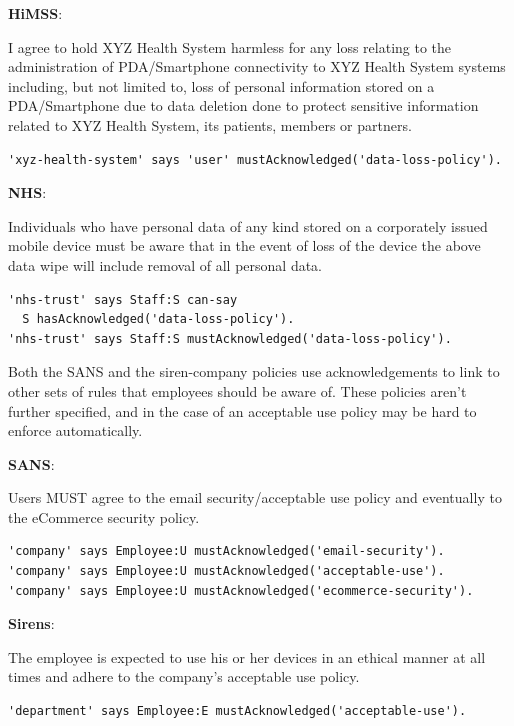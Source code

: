 \documentclass{llncs}
\newenvironment{policyrule}[1]{%
  \begin{mdframed}\footnotesize
      \noindent\textbf{\sffamily #1}:~\itshape%
}{%
  \end{mdframed}
}
\begin{document}
\begin{center}
  \noindent
    \begin{policyrule}{HiMSS}
      I agree to hold XYZ Health System harmless for any loss relating to the
      administration of PDA/Smartphone connectivity to XYZ Health System systems
      including, but not limited to, loss of personal information stored on a
      PDA/Smartphone due to data deletion done to protect sensitive information
      related to XYZ Health System, its patients, members or partners.
      \normalfont
      \begin{lstlisting}
'xyz-health-system' says 'user' mustAcknowledged('data-loss-policy').
      \end{lstlisting}
    \end{policyrule}
    \begin{policyrule}{NHS}
      Individuals who have personal data of any kind stored on a corporately
      issued mobile device must be aware that in the event of loss of the device
      the above data wipe will include removal of all personal data.
      \normalfont
      \begin{lstlisting}
'nhs-trust' says Staff:S can-say
  S hasAcknowledged('data-loss-policy').
'nhs-trust' says Staff:S mustAcknowledged('data-loss-policy').
      \end{lstlisting}
    \end{policyrule}   
\end{center}

Both the SANS and the siren-company policies use acknowledgements to link to other sets of rules that employees should be aware of.
These policies aren't further specified, and in the case of an acceptable use policy may be hard to enforce automatically.

\begin{policyrule}{SANS}
  Users MUST agree to the email security/acceptable use policy and eventually to the eCommerce security policy.
  \begin{lstlisting}
'company' says Employee:U mustAcknowledged('email-security'). 
'company' says Employee:U mustAcknowledged('acceptable-use'). 
'company' says Employee:U mustAcknowledged('ecommerce-security').
  \end{lstlisting}
\end{policyrule}
\begin{policyrule}{Sirens}
  The employee is expected to use his or her devices in an ethical manner at all times and adhere to the company's acceptable use policy.
  \begin{lstlisting}
'department' says Employee:E mustAcknowledged('acceptable-use').
  \end{lstlisting}
\end{policyrule}
\end{document}
